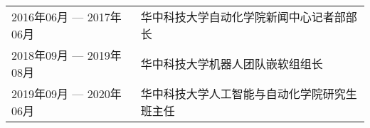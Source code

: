 \begin{table}[!htbp]
    \begin{tabular}{ll}
        2016年06月 --- 2017年06月 & 华中科技大学自动化学院新闻中心记者部部长           \\
        2018年09月 --- 2019年08月 & 华中科技大学机器人团队嵌软组组长         \\
        2019年09月 --- 2020年06月 & 华中科技大学人工智能与自动化学院研究生班主任       \\
    \end{tabular}
\end{table}
